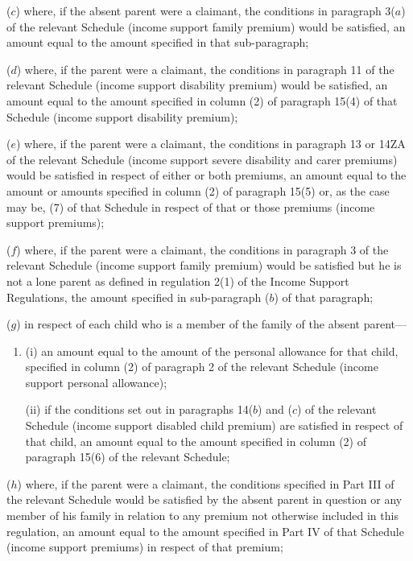 \documentclass[a4paper]{article}
\begin{document}
\begin{enumerate}
($c$) where, if the absent parent were a claimant, the conditions in paragraph 3($a$) of the relevant Schedule (income support family premium) would be satisfied, an amount equal to the amount specified in that sub-paragraph;

($d$) where, if the parent were a claimant, the conditions in paragraph 11 of the relevant Schedule (income support disability premium) would be satisfied, an amount equal to the amount specified in column (2) of paragraph 15(4) of that Schedule (income support disability premium);

($e$) where, if the parent were a claimant, the conditions in paragraph 13 or 14ZA of the relevant Schedule (income support severe disability and carer premiums) would be satisfied in respect of either or both premiums, an amount equal to the amount or amounts specified in column (2) of paragraph 15(5) or, as the case may be, (7) of that Schedule in respect of that or those premiums (income support premiums);

($f$) where, if the parent were a claimant, the conditions in paragraph 3 of the relevant Schedule (income support family premium) would be satisfied 
but he is not a lone parent as defined in regulation 2(1) of the Income Support Regulations,  %
the amount specified in 
sub-paragraph ($b$) of  %
that paragraph;

($g$) in respect of each child who is a member of the family of the absent parent—
\begin{enumerate}\item[]
(i) an amount equal to the amount of the personal allowance for that child, specified in column (2) of paragraph 2 of the relevant Schedule (income support personal allowance);

(ii) if the conditions set out in paragraphs 14($b$) and ($c$) of the relevant Schedule (income support disabled child premium) are satisfied in respect of that child, an amount equal to the amount specified in column (2) of paragraph 15(6) of the relevant Schedule;
\end{enumerate}

($h$) where, if the parent were a claimant, the conditions specified in Part III of the relevant Schedule would be satisfied by the absent parent in question or any member of his family in relation to any premium not otherwise included in this regulation, an amount equal to the amount specified in Part IV of that Schedule (income support premiums) in respect of that premium;


\end{enumerate}
\end{document}
